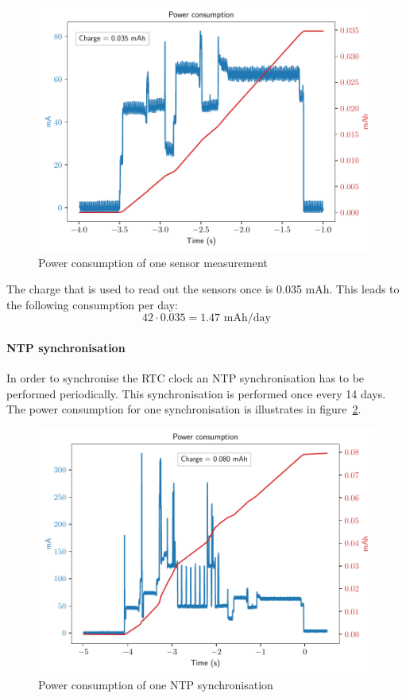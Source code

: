 \documentclass[11pt,a4paper]{article}
\begin{document}
\begin{figure}[H]
	\centering
	\includegraphics[width=1.0\linewidth]{sensor_pwr.pdf}
	\caption{Power consumption of one sensor measurement}
	\label{fig:sens_pwr}
\end{figure}

The charge that is used to read out the sensors once is 0.035 mAh. This leads to the following consumption per day:
\begin{equation}
	42 \cdot 0.035 = 1.47\text{ mAh/day}
\end{equation}

\paragraph{NTP synchronisation}
In order to synchronise the RTC clock an NTP synchronisation has to be performed periodically. This synchronisation is performed once every 14 days. The power consumption for one synchronisation is illustrates in figure~\ref{fig:ntp_pwr}.

\begin{figure}[H]
	\centering
	\includegraphics[width=1.0\linewidth]{sync_pwr.pdf}
	\caption{Power consumption of one NTP synchronisation}
	\label{fig:ntp_pwr}
\end{figure}
\end{document}
